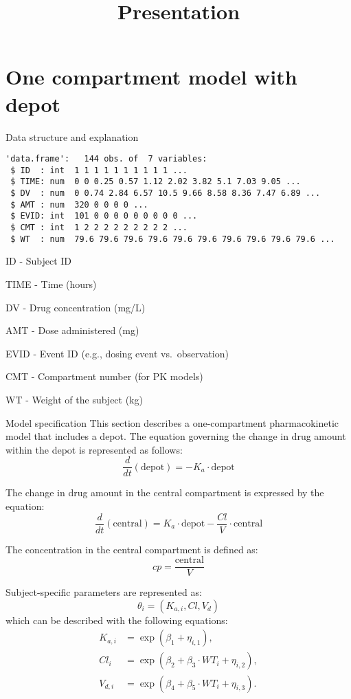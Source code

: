 \documentclass[
  ignorenonframetext,
]{beamer}
\title{Presentation}
\author{}
\date{}
\begin{document}
\frame{\titlepage}


\section{One compartment model with
depot}\label{one-compartment-model-with-depot}

\begin{frame}[fragile]{Data structure and explanation}
\label{data-structure-and-explanation}
\begin{verbatim}
'data.frame':   144 obs. of  7 variables:
 $ ID  : int  1 1 1 1 1 1 1 1 1 1 ...
 $ TIME: num  0 0 0.25 0.57 1.12 2.02 3.82 5.1 7.03 9.05 ...
 $ DV  : num  0 0.74 2.84 6.57 10.5 9.66 8.58 8.36 7.47 6.89 ...
 $ AMT : num  320 0 0 0 0 ...
 $ EVID: int  101 0 0 0 0 0 0 0 0 0 ...
 $ CMT : int  1 2 2 2 2 2 2 2 2 2 ...
 $ WT  : num  79.6 79.6 79.6 79.6 79.6 79.6 79.6 79.6 79.6 79.6 ...
\end{verbatim}

ID - Subject ID

TIME - Time (hours)

DV - Drug concentration (mg/L)

AMT - Dose administered (mg)

EVID - Event ID (e.g., dosing event vs.~observation)

CMT - Compartment number (for PK models)

WT - Weight of the subject (kg)
\end{frame}

\begin{frame}{Model specification}
\label{model-specification}
This section describes a one-compartment pharmacokinetic model that
includes a depot. The equation governing the change in drug amount
within the depot is represented as follows:
\[\frac{d}{dt}(\text{depot}) = -K_a \cdot \text{depot}\]

The change in drug amount in the central compartment is expressed by the
equation:
\[\frac{d}{dt}(\text{central}) = K_a \cdot \text{depot} - \frac{Cl}{V} \cdot \text{central}\]

The concentration in the central compartment is defined as:
\[cp = \frac{\text{central}}{V}\]

Subject-specific parameters are represented as:
\[\theta_i = (K_{a,i}, Cl, V_d)\] which can be described with the
following equations: \begin{align*}
    K_{a,i} &= \exp(\beta_1 + \eta_{i,1}),\\
    Cl_i &= \exp(\beta_2 + \beta_3 \cdot WT_i + \eta_{i,2}),\\
    V_{d,i} &= \exp(\beta_4 + \beta_5 \cdot WT_i + \eta_{i,3}).\\
\end{align*}
\end{frame}
\end{document}
